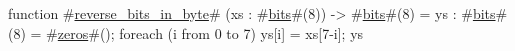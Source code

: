 function #\hyperref[sailRISCVzreversezybitszyinzybyte]{reverse\_bits\_in\_byte}# (xs : #\hyperref[sailRISCVzbits]{bits}#(8)) -> #\hyperref[sailRISCVzbits]{bits}#(8) = {
  ys : #\hyperref[sailRISCVzbits]{bits}#(8) = #\hyperref[sailRISCVzzzeros]{zeros}#();
  foreach (i from 0 to 7)
    ys[i] = xs[7-i];
  ys
}
